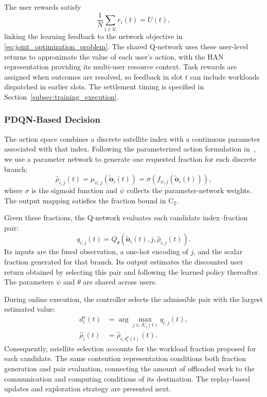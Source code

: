 \documentclass[journal]{IEEEtran}
\begin{document}
The user rewards satisfy
\[
\frac{1}{N}
\sum_{i\in\mathcal{U}}r_i(t)=U(t),
\]
linking the learning feedback to the network
objective in
\eqref{eq:joint_optimization_problem}.
The shared Q-network uses these user-level returns
to approximate the value of each user's action,
with the HAN representation providing its
multi-user resource context.
Task rewards are assigned when outcomes are resolved,
so feedback in slot $t$ can include workloads
dispatched in earlier slots.
The settlement timing is specified in
Section~\ref{subsec:training_execution}.

\subsubsection{PDQN-Based Decision}

The action space combines a discrete satellite
index with a continuous parameter associated
with that index.
Following the parameterized action formulation
in~\cite{xiong2018pdqn}, we use a parameter
network to generate one requested fraction
for each discrete branch:
\begin{equation}
\widehat{\rho}_{i,j}(t)
=
\mu_{\psi,j}
\left(\widetilde{\mathbf{o}}_i(t)\right)
=
\sigma\left(
f_{\psi,j}
\left(\widetilde{\mathbf{o}}_i(t)\right)
\right),
\label{eq:pdqn_parameter_generation}
\end{equation}
where $\sigma$ is the sigmoid function and
$\psi$ collects the parameter-network weights.
The output mapping satisfies the fraction bound
in $\mathrm{C}_2$.

Given these fractions, the Q-network evaluates
each candidate index--fraction pair:
\begin{equation}
q_{i,j}(t)
=
Q_{\theta}
\left(
\widetilde{\mathbf{o}}_i(t),
j,
\widehat{\rho}_{i,j}(t)
\right).
\label{eq:pdqn_pair_value}
\end{equation}
Its inputs are the fused observation,
a one-hot encoding of $j$, and the scalar
fraction generated for that branch.
Its output estimates the discounted user return
obtained by selecting this pair and following
the learned policy thereafter.
The parameters $\psi$ and $\theta$ are shared
across users.

During online execution, the controller selects
the admissible pair with the largest estimated value:
\begin{equation}
\begin{aligned}
d_i^{\star}(t)
&=
\arg\max_{j\in\mathcal{K}_i(t)}
q_{i,j}(t),\\
\widehat{\rho}_i(t)
&=
\widehat{\rho}_{i,d_i^{\star}(t)}(t).
\end{aligned}
\label{eq:pdqn_joint_selection}
\end{equation}
Consequently, satellite selection accounts for
the workload fraction proposed for each candidate.
The same contention representation conditions
both fraction generation and pair evaluation,
connecting the amount of offloaded work to
the communication and computing conditions
of its destination.
The replay-based updates and exploration strategy
are presented next.
\end{document}
